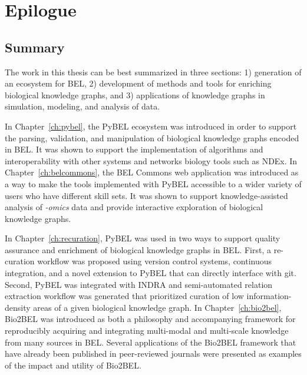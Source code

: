 \chapter{Epilogue}
\label{ch:conclusion}

\section{Summary}

The work in this thesis can be best summarized in three sections: 1) generation of an ecosystem for \ac{BEL}, 2) development of methods and tools for enriching biological knowledge graphs, and 3) applications of knowledge graphs in simulation, modeling, and analysis of data.

In Chapter~\ref{ch:pybel}, the PyBEL ecosystem was introduced in order to support the parsing, validation, and manipulation of biological knowledge graphs encoded in \ac{BEL}.
It was shown to support the implementation of algorithms and interoperability with other systems and networks biology tools such as NDEx.
In Chapter~\ref{ch:belcommons}, the BEL Commons web application was introduced as a way to make the tools implemented with PyBEL accessible to a wider variety of users who have different skill sets.
It was shown to support knowledge-assisted analysis of \textit{-omics} data and provide interactive exploration of biological knowledge graphs.

In Chapter~\ref{ch:recuration}, PyBEL was used in two ways to support quality assurance and enrichment of biological knowledge graphs in \ac{BEL}.
First, a re-curation workflow was proposed using version control systems, continuous integration, and a novel extension to PyBEL that can directly interface with git.
Second, PyBEL was integrated with \ac{INDRA} and semi-automated relation extraction workflow was generated that prioritized curation of low information-density areas of a given biological knowledge graph.
In Chapter~\ref{ch:bio2bel}, Bio2BEL was introduced as both a philosophy and accompanying framework for reproducibly acquiring and integrating multi-modal and multi-scale knowledge from many sources in \ac{BEL}.
Several applications of the Bio2BEL framework that have already been published in peer-reviewed journals were presented as examples of the impact and utility of Bio2BEL\@.

